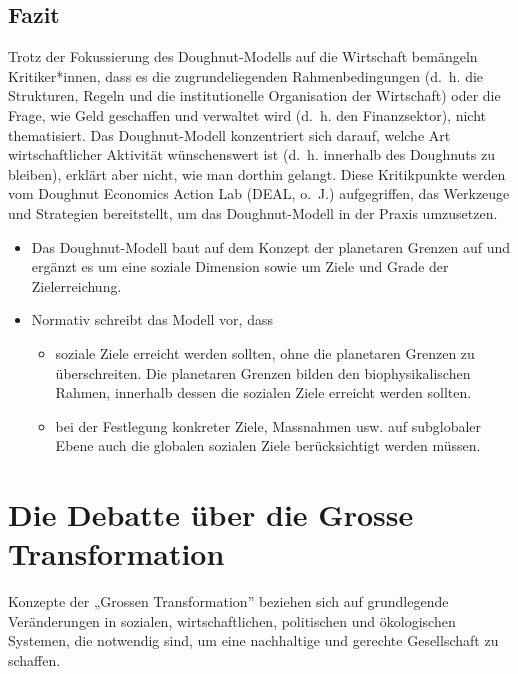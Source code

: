 \documentclass[
  nswissgerman,
  a4paper,
  openany]{book}
\begin{document}
\subsection{Fazit}\label{fazit-1}

Trotz der Fokussierung des Doughnut-Modells auf die Wirtschaft bemängeln
Kritiker*innen, dass es die zugrundeliegenden Rahmenbedingungen (d.~h.
die Strukturen, Regeln und die institutionelle Organisation der
Wirtschaft) oder die Frage, wie Geld geschaffen und verwaltet wird
(d.~h. den Finanzsektor), nicht thematisiert. Das Doughnut-Modell
konzentriert sich darauf, welche Art wirtschaftlicher Aktivität
wünschenswert ist (d.~h. innerhalb des Doughnuts zu bleiben), erklärt
aber nicht, wie man dorthin gelangt. Diese Kritikpunkte werden vom
Doughnut Economics Action Lab (DEAL, o.~J.) aufgegriffen, das Werkzeuge
und Strategien bereitstellt, um das Doughnut-Modell in der Praxis
umzusetzen.

\begin{itemize}
\item
  Das Doughnut-Modell baut auf dem Konzept der planetaren Grenzen auf
  und ergänzt es um eine soziale Dimension sowie um Ziele und Grade der
  Zielerreichung.
\item
  Normativ schreibt das Modell vor, dass

  \begin{itemize}
  \item
    soziale Ziele erreicht werden sollten, ohne die planetaren Grenzen
    zu überschreiten. Die planetaren Grenzen bilden den
    biophysikalischen Rahmen, innerhalb dessen die sozialen Ziele
    erreicht werden sollten.
  \item
    bei der Festlegung konkreter Ziele, Massnahmen usw. auf subglobaler
    Ebene auch die globalen sozialen Ziele berücksichtigt werden müssen.
  \end{itemize}
\end{itemize}

\section{Die Debatte über die Grosse
Transformation}\label{die-debatte-uxfcber-die-grosse-transformation}

Konzepte der „Grossen Transformation'' beziehen sich auf grundlegende
Veränderungen in sozialen, wirtschaftlichen, politischen und
ökologischen Systemen, die notwendig sind, um eine nachhaltige und
gerechte Gesellschaft zu schaffen.
\end{document}
